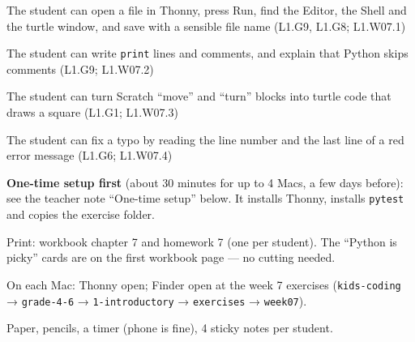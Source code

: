 
\begin{objectives}
  \item The student can open a file in Thonny, press Run, find the Editor, the Shell and the turtle window, and save with a sensible file name (L1.G9, L1.G8; L1.W07.1)
  \item The student can write \texttt{print} lines and comments, and explain that Python skips comments (L1.G9; L1.W07.2)
  \item The student can turn Scratch \enquote{move} and \enquote{turn} blocks into turtle code that draws a square (L1.G1; L1.W07.3)
  \item The student can fix a typo by reading the line number and the last line of a red error message (L1.G6; L1.W07.4)
\end{objectives}

\begin{materials}
  \item \textbf{One-time setup first} (about 30 minutes for up to 4 Macs, a few days before): see the teacher note \enquote{One-time setup} below. It installs Thonny, installs \texttt{pytest} and copies the exercise folder.
  \item Print: workbook chapter 7 and homework 7 (one per student). The \enquote{Python is picky} cards are on the first workbook page --- no cutting needed.
  \item On each Mac: Thonny open; Finder open at the week 7 exercises (\texttt{kids-coding} → \texttt{grade-4-6} → \texttt{1-introductory} → \texttt{exercises} → \texttt{week07}).
  \item Paper, pencils, a timer (phone is fine), 4 sticky notes per student.
\end{materials}

